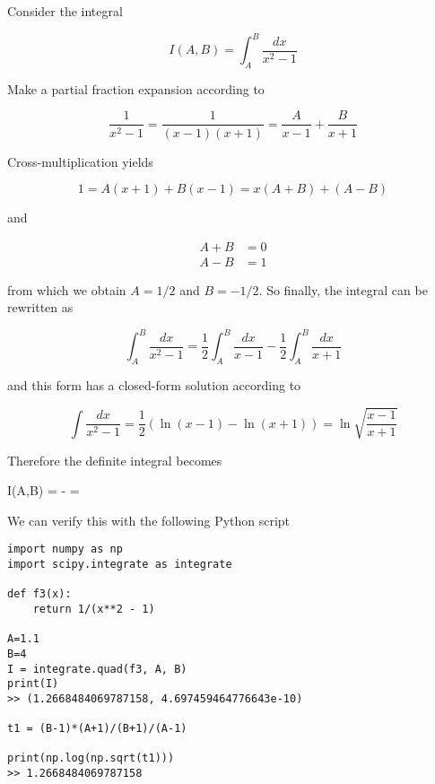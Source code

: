 
Consider the integral

\[
I(A,B) = \int_A^B \frac{dx}{x^2-1}
\]

Make a partial fraction expansion according to

\[
\frac{1}{x^2-1} = \frac{1}{(x-1)(x+1)} = \frac{A}{x-1} + \frac{B}{x+1}
\]

Cross-multiplication yields

\[
1 = A(x+1) + B(x-1) = x(A+B) + (A-B)
\]

and


\begin{align*}
A+B & = 0 \\
A-B & = 1
\end{align*}


from which we obtain \(A = 1/2\) and \(B = -1/2\). So finally, the integral can be rewritten as

\[
\int_A^B \frac{dx}{x^2-1} = \frac{1}{2} \int_A^B \frac{dx}{x-1} - \frac{1}{2} \int_A^B \frac{dx}{x+1}
\]

and this form has a closed-form solution according to

\[
\int \frac{dx}{x^2-1} = \frac{1}{2} \left( \ln (x-1) - \ln (x+1) \right) = \ln \sqrt{\frac{x-1}{x+1}}
\]

Therefore the definite integral becomes

\bee
  I(A,B) = \ln {} - \ln {} = \ln {}
\eee

We can verify this with the following Python script

\begin{verbatim}
import numpy as np
import scipy.integrate as integrate

def f3(x):
    return 1/(x**2 - 1)

A=1.1
B=4
I = integrate.quad(f3, A, B)
print(I)
>> (1.2668484069787158, 4.697459464776643e-10)

t1 = (B-1)*(A+1)/(B+1)/(A-1)

print(np.log(np.sqrt(t1)))
>> 1.2668484069787158
\end{verbatim}


